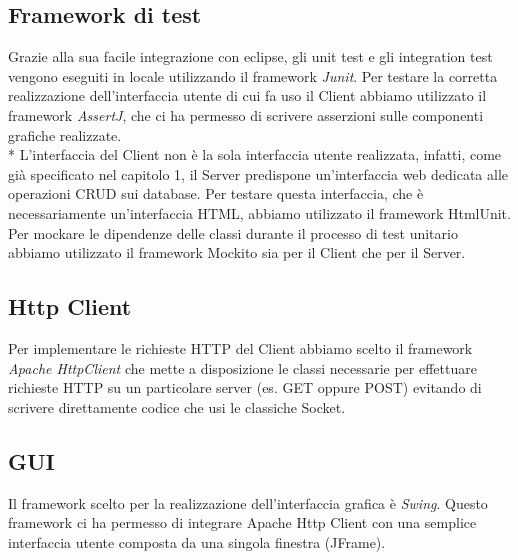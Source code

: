 \subsection{Framework di test}
Grazie alla sua facile integrazione con eclipse, gli unit test e gli integration test vengono eseguiti in locale utilizzando il framework \emph{Junit}. Per testare la corretta realizzazione dell'interfaccia utente di cui fa uso il Client abbiamo utilizzato il framework \emph{AssertJ}, che ci ha permesso di scrivere asserzioni sulle componenti grafiche realizzate.\\*
L'interfaccia del Client non \`e la sola interfaccia utente realizzata, infatti, come gi\`a specificato nel capitolo 1, il Server predispone un'interfaccia web dedicata alle operazioni CRUD sui database. Per testare questa interfaccia, che \`e necessariamente un'interfaccia HTML, abbiamo utilizzato il framework HtmlUnit. Per mockare le dipendenze delle classi durante il processo di test unitario abbiamo utilizzato il framework Mockito sia per il Client che per il Server.
\subsection{Http Client}
Per implementare le richieste HTTP del Client abbiamo scelto il framework \emph{Apache HttpClient} che mette a disposizione le classi necessarie per effettuare richieste HTTP su un particolare server (es. GET oppure POST) evitando di scrivere direttamente codice che usi le classiche Socket.
\subsection{GUI}
Il framework scelto per la realizzazione dell'interfaccia grafica \`e \emph{Swing}. Questo framework ci ha permesso di integrare Apache Http Client con una semplice interfaccia utente composta da una singola finestra (JFrame).